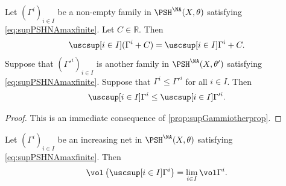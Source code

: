 \begin{proposition}\label{prop:supGammiotherprop2}
    Let $(\Gamma^i)_{i\in I}$ be a non-empty family in $\PSH^{\NA}(X,\theta)$ satisfying \eqref{eq:supPSHNAmaxfinite}. Let $C\in \mathbb{R}$. Then
    \[
    \uscsup[i\in I] (\Gamma^i+C)=\uscsup[i\in I] \Gamma^i+C.
    \]
    Suppose that $(\Gamma'^i)_{i\in I}$ is another family in $\PSH^{\NA}(X,\theta')$ satisfying \eqref{eq:supPSHNAmaxfinite}. Suppose that $\Gamma^i\leq \Gamma'^i$ for all $i\in I$. Then
    \[
    \uscsup[i\in I]\Gamma^i\leq \uscsup[i\in I]\Gamma'^i.
    \]
\end{proposition}
\begin{proof}
    This is an immediate consequence of \cref{prop:supGammiotherprop}.
\end{proof}

\begin{proposition}\label{prop:vol_NA_incnet_cont}
    Let $(\Gamma^i)_{i\in I}$ be an increasing net in $\PSH^{\NA}(X,\theta)$ satisfying \eqref{eq:supPSHNAmaxfinite}. Then
    \begin{equation}\label{eq:prop:vol_NA_incnet_cont}
    \vol \left( \uscsup[i\in I] \Gamma^i \right)=\lim_{i\in I} \vol \Gamma^i.
    \end{equation}
\end{proposition}
